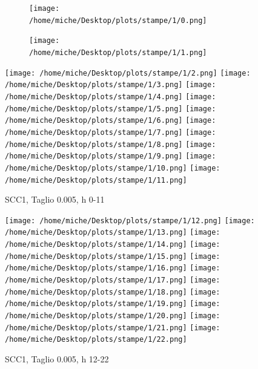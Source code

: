 \documentclass[10pt,a4paper]{article}
\begin{document}
\begin{figure}
\centering

\begin{subfigure}[b]{1\textwidth}
\texttt{[image: /home/miche/Desktop/plots/stampe/1/0.png]}
\end{subfigure}

\begin{subfigure}[b]{1\textwidth}
\texttt{[image: /home/miche/Desktop/plots/stampe/1/1.png]}
\end{subfigure}
\texttt{[image: /home/miche/Desktop/plots/stampe/1/2.png]}
\texttt{[image: /home/miche/Desktop/plots/stampe/1/3.png]}
\texttt{[image: /home/miche/Desktop/plots/stampe/1/4.png]}
\texttt{[image: /home/miche/Desktop/plots/stampe/1/5.png]}
\texttt{[image: /home/miche/Desktop/plots/stampe/1/6.png]}
\texttt{[image: /home/miche/Desktop/plots/stampe/1/7.png]}
\texttt{[image: /home/miche/Desktop/plots/stampe/1/8.png]}
\texttt{[image: /home/miche/Desktop/plots/stampe/1/9.png]}
\texttt{[image: /home/miche/Desktop/plots/stampe/1/10.png]}
\texttt{[image: /home/miche/Desktop/plots/stampe/1/11.png]}

\caption{SCC1, Taglio 0.005, h 0-11}
\end{figure}
\begin{figure}
\texttt{[image: /home/miche/Desktop/plots/stampe/1/12.png]}
\texttt{[image: /home/miche/Desktop/plots/stampe/1/13.png]}
\texttt{[image: /home/miche/Desktop/plots/stampe/1/14.png]}
\texttt{[image: /home/miche/Desktop/plots/stampe/1/15.png]}
\texttt{[image: /home/miche/Desktop/plots/stampe/1/16.png]}
\texttt{[image: /home/miche/Desktop/plots/stampe/1/17.png]}
\texttt{[image: /home/miche/Desktop/plots/stampe/1/18.png]}
\texttt{[image: /home/miche/Desktop/plots/stampe/1/19.png]}
\texttt{[image: /home/miche/Desktop/plots/stampe/1/20.png]}
\texttt{[image: /home/miche/Desktop/plots/stampe/1/21.png]}
\texttt{[image: /home/miche/Desktop/plots/stampe/1/22.png]}
\caption{SCC1, Taglio 0.005, h 12-22}
\end{figure}
\end{document}
